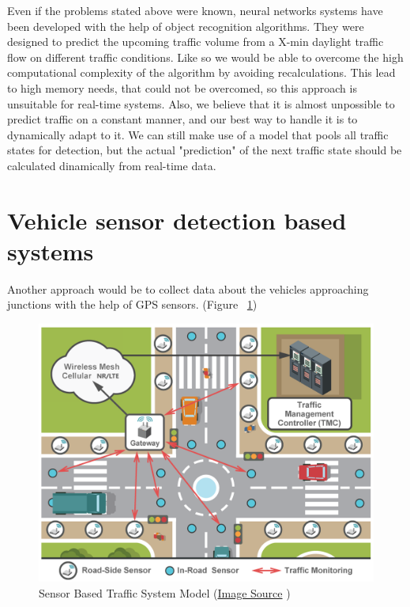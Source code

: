 \documentclass[17pt]{report}
\begin{document}
\indent \indent
Even if the problems stated above were known,
neural networks systems have been developed with the help of
object recognition algorithms.
They were designed to predict the upcoming traffic volume
from a X-min daylight traffic flow on different traffic conditions. 
Like so we would be able to overcome the high computational
complexity of the algorithm by avoiding 
recalculations. This lead to high memory needs,
that could not be overcomed, so this approach is
unsuitable for real-time systems. Also, we believe that it 
is almost unpossible to predict traffic on a constant manner, 
and our best way to handle it is to dynamically adapt to it.
We can still make use of a model that pools all traffic states 
for detection, but the actual "prediction" of the next traffic 
state should be calculated dinamically from real-time data.\\

\section{Vehicle sensor detection based systems}
\indent \indent
Another approach would be to collect data about the vehicles 
approaching junctions with the help of GPS sensors.
(Figure ~\ref{fig:SensorRecognitionSystem})\\

\begin{figure}[h!]
    \includegraphics[width=\textwidth]{SensorsBasedTrafficControlSystemRepresentation.png}
    \caption{Sensor Based Traffic System Model 
    (\href{https://www.researchgate.net/figure/Communications-chain-of-data-feeds-in-smart-transportation_fig3_309740417}{Image Source} \textcopyright)}
    \label{fig:SensorRecognitionSystem}
\end{figure}
\end{document}

